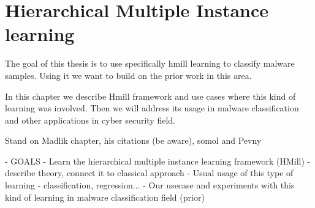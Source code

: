 \chapter{Hierarchical Multiple Instance learning}
The goal of this thesis is to use specifically hmill learning to classify malware samples. Using it we want to  build on the prior work in this area. 

In this chapter we describe Hmill framework and use cases where this kind of learning was involved. Then we will address its usage in malware classification and other applications in cyber security field.


Stand on Madlik chapter, his citations (be aware), somol and Pevny


- GOALS 
- Learn the hierarchical multiple instance learning framework (HMill)
- describe theory, connect it to classical approach
- Usual usage of this type of learning - classification, regression...
- Our usecase and experiments with this kind of learning in malware classification field (prior)